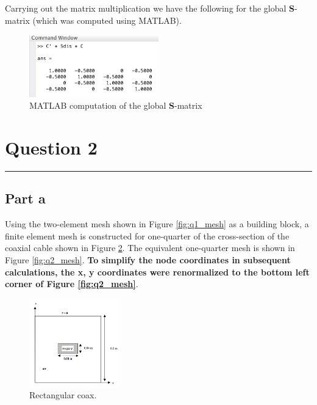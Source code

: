 \documentclass[11pt]{amsart}
\begin{document}
Carrying out the matrix multiplication we have the following for the global \textbf{S}-matrix (which was computed using MATLAB).

\begin{figure}[h]
    \includegraphics[width=0.5\textwidth]{assets/question_1_matlab.png}
    \caption{MATLAB computation of the global \textbf{S}-matrix}
    \label{fig:q1_matlab}
\end{figure}

\vspace{0.25in}
\begin{center}
\end{center}

\pagebreak

\section*{Question 2}
\vspace*{-0.2in}
\noindent\rule{\textwidth}{0.4pt}

\subsection*{Part a}
Using the two-element mesh shown in Figure \ref{fig:q1_mesh} as a building block, a finite element mesh is constructed for one-quarter of the cross-section of the coaxial cable shown in Figure \ref{fig:q2_coax}. The equivalent one-quarter mesh is shown in Figure \ref{fig:q2_mesh}. \textbf{To simplify the node coordinates in subsequent calculations, the x, y coordinates were renormalized to the bottom left corner of Figure \ref{fig:q2_mesh}}.

\begin{figure}[h]
    \includegraphics[width=0.35\textwidth]{assets/coax.png}
    \caption{Rectangular coax.}
    \label{fig:q2_coax}
\end{figure}
\end{document}
